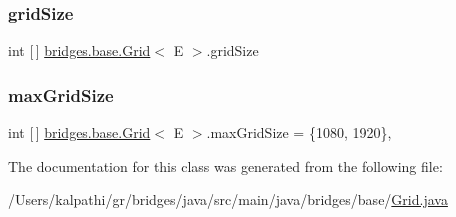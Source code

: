\mbox{\label{classbridges_1_1base_1_1_grid_a54a66479f78022570253d771206a0420}} 
\subsubsection{\texorpdfstring{gridSize}{gridSize}}
{\footnotesize\ttfamily int \mbox{[}$\,$\mbox{]} \mbox{\hyperlink{classbridges_1_1base_1_1_grid}{bridges.\+base.\+Grid}}$<$ E $>$.grid\+Size\hspace{0.3cm}{\ttfamily [protected]}}

\mbox{\label{classbridges_1_1base_1_1_grid_a803fd4c070a22863c82581f0bb258c1c}} 
\subsubsection{\texorpdfstring{maxGridSize}{maxGridSize}}
{\footnotesize\ttfamily int \mbox{[}$\,$\mbox{]} \mbox{\hyperlink{classbridges_1_1base_1_1_grid}{bridges.\+base.\+Grid}}$<$ E $>$.max\+Grid\+Size = \{1080, 1920\}\hspace{0.3cm}{\ttfamily [static]}, {\ttfamily [protected]}}



The documentation for this class was generated from the following file\+:\begin{DoxyCompactItemize}
\item 
/\+Users/kalpathi/gr/bridges/java/src/main/java/bridges/base/\mbox{\hyperlink{_grid_8java}{Grid.\+java}}\end{DoxyCompactItemize}
